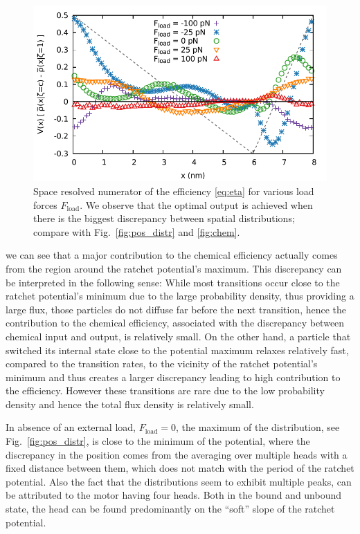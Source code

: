 \documentclass[aps,pre,twocolumn,showpacs,showkeys,superscriptaddress,floatfix]{revtex4-1}
\begin{document}
\begin{figure}[t]
\centering
\includegraphics[width=0.9\linewidth,height=!]{chem_efficiency_distr_all_F}
\caption{
\label{fig:chem_efficiency_distr}
Space resolved numerator of the efficiency \eqref{eq:eta} for various load forces $F_\text{load}$. 
We observe that the optimal output is achieved when there is the biggest discrepancy between spatial distributions; compare with Fig.~\ref{fig:pos_distr} and \ref{fig:chem}. 
}
\end{figure}
we can see that a major contribution to the chemical efficiency actually comes from the region around the ratchet potential's maximum.
This discrepancy can be interpreted in the following sense: 
While most transitions occur close to the ratchet potential's minimum due to the large probability density, thus providing a large flux, 
those particles do not diffuse far before the next transition, 
hence the contribution to the chemical efficiency, associated with the discrepancy between chemical input and output, is relatively small. 
On the other hand, a particle that switched its internal state close to the potential maximum relaxes relatively fast, compared to the transition rates, 
to the vicinity of the ratchet potential's minimum and thus creates a larger discrepancy leading to high contribution to the efficiency. 
However these transitions are rare due to the low probability density and hence the total flux density is relatively small.  

In absence of an external load, $F_\text{load}=0$, 
the maximum of the distribution, see Fig.~\ref{fig:pos_distr}, is close to the minimum of the potential,  
where the discrepancy in the position comes from the averaging over multiple heads with a fixed distance between them, 
which does not match with the period of the ratchet potential. 
Also the fact that the distributions seem to exhibit multiple peaks, can be attributed to the motor having four heads. 
Both in the bound and unbound state, the head can be found predominantly on the ``soft'' slope of the ratchet potential.
\end{document}
